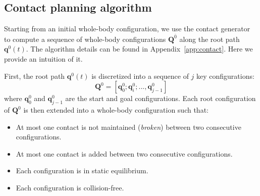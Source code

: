 
\subsection{Contact planning algorithm}
Starting from an initial whole-body configuration, we use the contact generator to compute a sequence
of whole-body configurations  $\mathbf{Q}^{\overline{0}}$ along the root path $\mathbf{q}^0(t)$.
The algorithm details can be found in Appendix~\ref{app:contact}. Here we provide an intuition of it.

First, the root path $\mathbf{q}^0(t)$ is discretized into a sequence of $j$ key configurations:  
\begin{equation*}
	\mathbf{Q}^0 = [\mathbf{q}^0_{0}; \mathbf{q}^0_{i}; ..., \mathbf{q}^0_{j-1}]
\end{equation*} 
where $\mathbf{q}^0_{0}$ and $\mathbf{q}^0_{j-1}$ are the start and goal configurations. %
Each root configuration of $\mathbf{Q}^0$ is then extended into a whole-body configuration such that:
\begin{itemize} 
\item At most one contact is not maintained (\textit{broken}) between two consecutive configurations.
\item At most one contact is added between two consecutive configurations.
\item Each configuration is in static equilibrium.
\item Each configuration is collision-free.
\end{itemize} 




